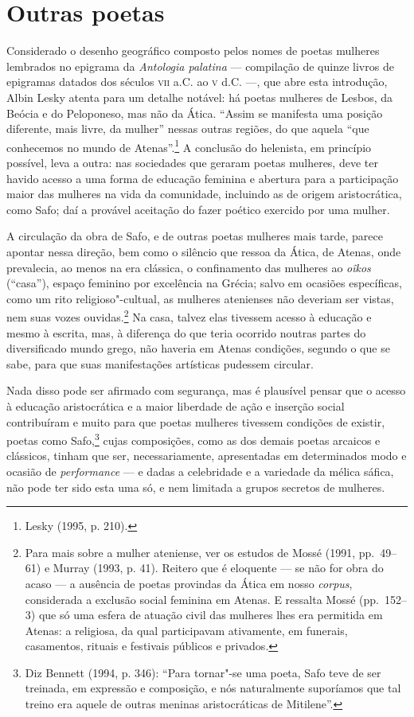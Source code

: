 \section*{Outras poetas}

Considerado o desenho geográfico composto pelos nomes de poetas mulheres
lembrados no epigrama da \textit{Antologia palatina} --- compilação de quinze livros de
epigramas datados dos séculos \textsc{vii} a.C. ao \textsc{v} d.C. ---, que abre esta introdução, Albin Lesky atenta para um detalhe
notável: há poetas mulheres de Lesbos, da Beócia e do Peloponeso, mas não da
Ática. “Assim se manifesta uma posição diferente, mais livre, da mulher”
nessas outras regiões, do que aquela “que conhecemos no mundo de Atenas”.\footnote{ Lesky (1995, p. 210).} A
conclusão do helenista, em princípio possível, leva a outra: nas sociedades
que geraram poetas mulheres, deve ter havido acesso a uma forma de educação
feminina e abertura para a participação maior das mulheres na vida da
comunidade, incluindo as de origem aristocrática, como Safo; daí a provável
aceitação do fazer poético exercido por uma mulher.

A circulação da obra de Safo, e de outras poetas mulheres mais tarde, parece
apontar nessa direção, bem como o silêncio que ressoa da Ática, de Atenas, onde
prevalecia, ao menos na era clássica, o confinamento das mulheres ao \textit{oîkos} (“casa”), espaço
feminino por excelência na Grécia; salvo em ocasiões específicas, como um rito
religioso"-cultual, as mulheres atenienses não deveriam ser vistas, nem suas
vozes ouvidas.\footnote{ Para mais sobre a mulher ateniense, ver os estudos de
Mossé (1991, pp.~49--61) e Murray (1993, p. 41). Reitero que é eloquente --- se
não for obra do acaso --- a ausência de poetas provindas da Ática em nosso
\textit{corpus}, considerada a exclusão social feminina em Atenas. E ressalta
Mossé (pp.~152--3) que só uma esfera de atuação civil das mulheres lhes era
permitida em Atenas: a religiosa, da qual participavam ativamente, em funerais,
casamentos, rituais e festivais públicos e privados.} Na casa, talvez elas
tivessem acesso à educação e mesmo à escrita, mas, à diferença do que teria
ocorrido noutras partes do diversificado mundo grego, não haveria em Atenas
condições, segundo o que se sabe, para que suas manifestações artísticas
pudessem circular.

Nada disso pode ser afirmado com segurança, mas é plausível pensar que o acesso
à educação aristocrática e a maior liberdade de ação e inserção social
contribuíram e muito para que poetas mulheres tivessem condições de existir,
poetas como Safo,\footnote{ Diz Bennett (1994, p. 346):
“Para tornar"-se uma poeta, Safo teve de ser treinada, em expressão
e composição, e nós naturalmente suporíamos que tal treino era aquele de outras
meninas aristocráticas de Mitilene”.} cujas composições, como as dos demais
poetas arcaicos e clássicos, tinham que ser, necessariamente, apresentadas em
determinados modo e ocasião de \textit{performance} --- e dadas a celebridade e a variedade da mélica sáfica, não pode ter sido esta uma só, e nem limitada
a grupos secretos de mulheres. 

